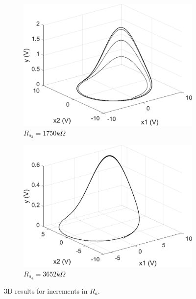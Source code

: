 \begin{figure}
\begin{subfigure}[b]{0.22\textwidth}
            \includegraphics[scale=0.28]{figs/paraA/3dParaA1750.pdf}
            \caption{$R_{a_3} = 1750k\Omega$}    
        \end{subfigure}
        \begin{subfigure}[b]{0.22\textwidth}   
            \centering 
            \includegraphics[scale=0.28]{figs/paraA/3dParaA3652.pdf}
            \caption{$R_{a_4} = 3652k\Omega$}   
            \label{fig:3dparaAvard}
        \end{subfigure}
        \caption{3D results for increments in $R_a$.} 
        \label{fig:3dparaAvar}
	\end{figure}
	
